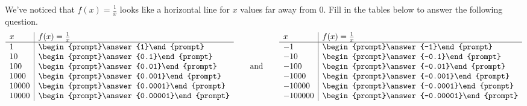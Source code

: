 \documentclass{ximera}
\begin{document}
\begin{problem}
We've noticed that $f(x) = \frac{1}{x}$ looks like a horizontal line for $x$ values far away from $0$.  Fill in the tables below to answer the following question. 
  \[
  \begin{array}{l|l}
    x      & f(x) = \frac{1}{x}     \\ \hline
    1    & \begin{prompt}\answer{1}\end{prompt}\\
    10   & \begin{prompt}\answer{0.1}\end{prompt}\\
    100  & \begin{prompt}\answer{0.01}\end{prompt}\\
    1000 & \begin{prompt}\answer{0.001}\end{prompt} \\
    10000 & \begin{prompt}\answer{0.0001}\end{prompt} \\
    10000 & \begin{prompt}\answer{0.00001}\end{prompt} \\
  \end{array}
  \qquad\text{and}\qquad
  \begin{array}{l|l}
     x      & f(x) = \frac{1}{x}     \\ \hline
    -1    & \begin{prompt}\answer{-1}\end{prompt}\\
    -10   & \begin{prompt}\answer{-0.1}\end{prompt}\\
    -100  & \begin{prompt}\answer{-0.01}\end{prompt}\\
    -1000 & \begin{prompt}\answer{-0.001}\end{prompt} \\
    -10000 & \begin{prompt}\answer{-0.0001}\end{prompt} \\
    -100000 & \begin{prompt}\answer{-0.00001}\end{prompt} \\
    \end{array}
  \]
  

\end{problem}
\end{document}
